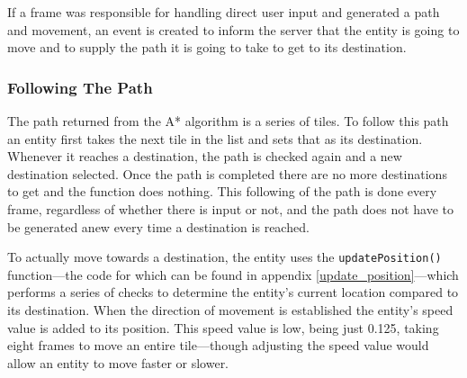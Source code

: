 
If a frame was responsible for handling direct user input and generated a path and movement, an event is created to inform the server that the entity is going to move and to supply the path it is going to take to get to its destination.


\subsubsection{Following The Path}
The path returned from the A* algorithm is a series of tiles. To follow this path an entity first takes the next tile in the list and sets that as its destination. Whenever it reaches a destination, the path is checked again and a new destination selected. Once the path is completed there are no more destinations to get and the function does nothing. This following of the path is done every frame, regardless of whether there is input or not, and the path does not have to be generated anew every time a destination is reached.

To actually move towards a destination, the entity uses the \texttt{updatePosition()} function---the code for which can be found in appendix \ref{update_position}---which performs a series of checks to determine the entity's current location compared to its destination. When the direction of movement is established the entity's speed value is added to its position. This speed value is low, being just 0.125, taking eight frames to move an entire tile---though adjusting the speed value would allow an entity to move faster or slower.


